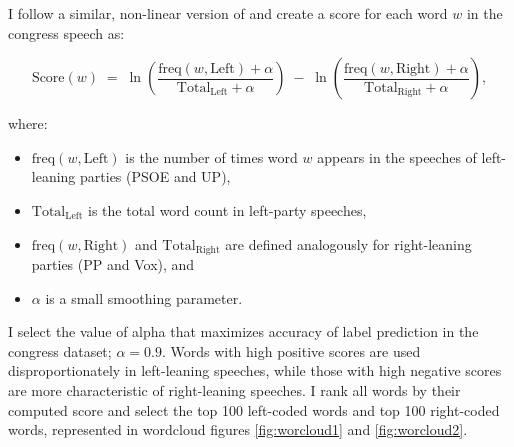 \documentclass[12pt]{article}
\begin{document}
I follow a similar, non-linear version of \cite{laver2003extracting} and create a score for each word $w$ in the congress speech as: 


	
	\begin{equation}
		\text{Score}(w) \;=\; \ln \left( \frac{\mathrm{freq}(w,\text{Left}) + \alpha}{\mathrm{Total}_{\text{Left}} + \alpha} \right) \;-\; \ln \left( \frac{\mathrm{freq}(w,\text{Right}) + \alpha}{\mathrm{Total}_{\text{Right}} + \alpha} \right),
		\label{eq:log_ratio}
	\end{equation}
	
	where:
	\begin{itemize}
		\item $\mathrm{freq}(w,\text{Left})$ is the number of times word $w$ appears in the speeches of left-leaning parties (PSOE and UP),
		\item $\mathrm{Total}_{\text{Left}}$ is the total word count in left-party speeches,
		\item $\mathrm{freq}(w,\text{Right})$ and $\mathrm{Total}_{\text{Right}}$ are defined analogously for right-leaning parties (PP and Vox), and
		\item $\alpha$ is a small smoothing parameter.
		
	\end{itemize}
	
	I select the value of alpha that maximizes accuracy of label prediction in the congress dataset; $\alpha=0.9$.	
	Words with high positive scores are used disproportionately in left-leaning speeches, while those with high negative scores are more characteristic of right-leaning speeches. I rank all words by their computed score and select the top 100 left-coded words and top 100 right-coded words, represented in wordcloud figures  \ref{fig:worcloud1} and \ref{fig:worcloud2}.
	

	
	
	
	
\end{document}
